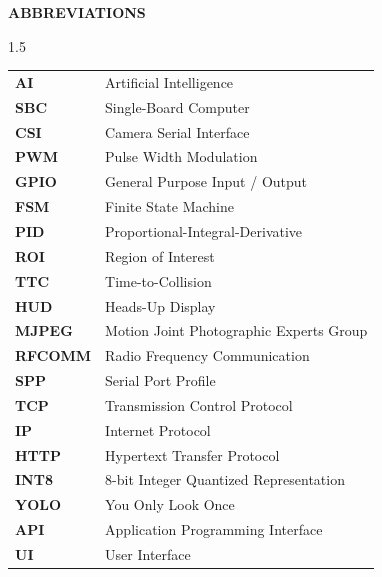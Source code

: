 \newpage
\thispagestyle{fancy}
\begin{center}
\vspace*{0.2cm}
{\Large\textbf{ABBREVIATIONS}}
\end{center}
\vspace{0.8cm}

\noindent
\begin{spacing}{1.5}
\begin{tabular}{p{3.0cm} p{11.5cm}}
\textbf{AI} & Artificial Intelligence \\
\textbf{SBC} & Single-Board Computer \\
\textbf{CSI} & Camera Serial Interface \\
\textbf{PWM} & Pulse Width Modulation \\
\textbf{GPIO} & General Purpose Input / Output \\
\textbf{FSM} & Finite State Machine \\
\textbf{PID} & Proportional-Integral-Derivative \\
\textbf{ROI} & Region of Interest \\
\textbf{TTC} & Time-to-Collision \\
\textbf{HUD} & Heads-Up Display \\
\textbf{MJPEG} & Motion Joint Photographic Experts Group \\
\textbf{RFCOMM} & Radio Frequency Communication \\
\textbf{SPP} & Serial Port Profile \\
\textbf{TCP} & Transmission Control Protocol \\
\textbf{IP} & Internet Protocol \\
\textbf{HTTP} & Hypertext Transfer Protocol \\
\textbf{INT8} & 8-bit Integer Quantized Representation \\
\textbf{YOLO} & You Only Look Once \\
\textbf{API} & Application Programming Interface \\
\textbf{UI} & User Interface \\
\end{tabular}
\end{spacing}
